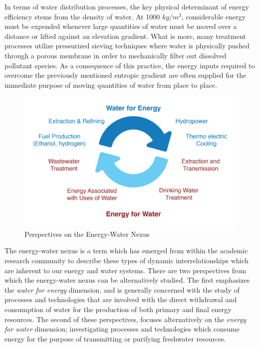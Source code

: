     In terms of water distribution processes, the key physical determinant of energy efficiency stems from the density of water. At 1000 $kg/m^3$, considerable energy must be expended whenever large quantities of water must be moved over a distance or lifted against an elevation gradient. What is more, many treatment processes utilize pressurized sieving techniques where water is physically pushed through a porous membrane in order to mechanically filter out dissolved pollutant species. As a consequence of this practice, the energy inputs required to overcome the previously mentioned entropic gradient are often supplied for the immediate purpose of moving quantities of water from place to place.
    
     \begin{figure}[!h]
       \centering
       \includegraphics[width=4.5in]{figures/energy-water-nexus-perspectives.png}
       \caption[Perspectives on the Energy-Water Nexus]{Perspectives on the Energy-Water Nexus}
       \label{fig:energy-water-perspectives}
     \end{figure}
     
    The energy-water nexus is a term which has emerged from within the academic research community to describe these types of dynamic interrelationships which are inherent to our energy and water systems. There are two perspectives from which the energy-water nexus can be alternatively studied. The first emphasizes the \textit{water for energy} dimension, and is generally concerned with the study of processes and technologies that are involved with the direct withdrawal and consumption of water for the production of both primary and final energy resources. The second of these perspectives, focuses alternatively on the \textit{energy for water} dimension; investigating processes and technologies which consume energy for the purpose of transmitting or purifying freshwater resources. 
    
